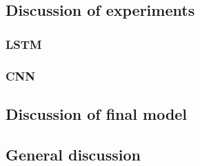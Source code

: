 \subsection{Discussion of experiments}
\subsubsection{LSTM}

\subsubsection{CNN}


\subsection{Discussion of final model}
\subsection{General discussion}